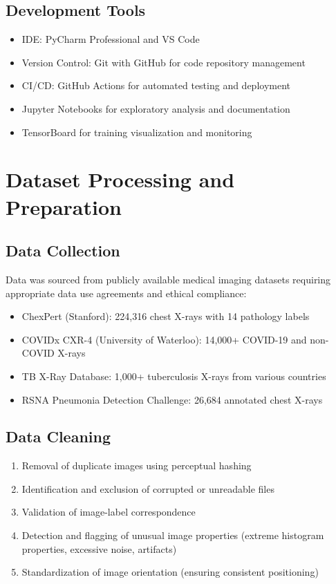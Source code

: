 {\subsection{Development Tools}

\begin{itemize}
    \item IDE: PyCharm Professional and VS Code
    \item Version Control: Git with GitHub for code repository management
    \item CI/CD: GitHub Actions for automated testing and deployment
    \item Jupyter Notebooks for exploratory analysis and documentation
    \item TensorBoard for training visualization and monitoring
\end{itemize}

\section{Dataset Processing and Preparation}

\subsection{Data Collection}

Data was sourced from publicly available medical imaging datasets requiring appropriate data use agreements and ethical compliance:

\begin{itemize}
    \item ChexPert (Stanford): 224,316 chest X-rays with 14 pathology labels
    \item COVIDx CXR-4 (University of Waterloo): 14,000+ COVID-19 and non-COVID X-rays
    \item TB X-Ray Database: 1,000+ tuberculosis X-rays from various countries
    \item RSNA Pneumonia Detection Challenge: 26,684 annotated chest X-rays
\end{itemize}

\subsection{Data Cleaning}

\begin{enumerate}
    \item Removal of duplicate images using perceptual hashing
    \item Identification and exclusion of corrupted or unreadable files
    \item Validation of image-label correspondence
    \item Detection and flagging of unusual image properties (extreme histogram properties, excessive noise, artifacts)
    \item Standardization of image orientation (ensuring consistent positioning)
\end{enumerate}

}
